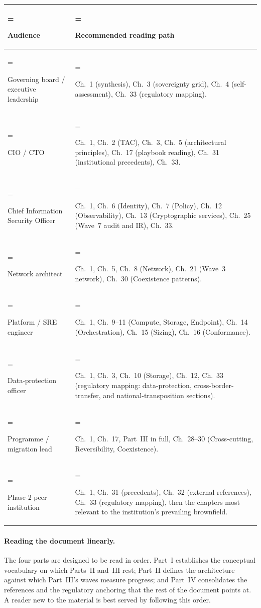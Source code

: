 \begin{table}[H]
\centering\small
\renewcommand{\arraystretch}{1.18}
\begin{tabularx}{\textwidth}{%
  >{\hsize=0.55\hsize\linewidth=\hsize\bfseries\raggedright\arraybackslash}X%
  >{\hsize=1.45\hsize\linewidth=\hsize\raggedright\arraybackslash}X%
}
\toprule
Audience & Recommended reading path \\
\midrule
Governing board / executive leadership
  & Ch.~1 (synthesis), Ch.~3 (sovereignty grid), Ch.~4
    (self-assessment), Ch.~33 (regulatory mapping). \\
CIO / CTO
  & Ch.~1, Ch.~2 (TAC), Ch.~3, Ch.~5 (architectural principles),
    Ch.~17 (playbook reading), Ch.~31 (institutional precedents),
    Ch.~33. \\
Chief Information Security Officer
  & Ch.~1, Ch.~6 (Identity), Ch.~7 (Policy), Ch.~12 (Observability),
    Ch.~13 (Cryptographic services), Ch.~25 (Wave~7 audit and IR),
    Ch.~33. \\
Network architect
  & Ch.~1, Ch.~5, Ch.~8 (Network), Ch.~21 (Wave~3 network),
    Ch.~30 (Coexistence patterns). \\
Platform / SRE engineer
  & Ch.~1, Ch.~9--11 (Compute, Storage, Endpoint),
    Ch.~14 (Orchestration), Ch.~15 (Sizing),
    Ch.~16 (Conformance). \\
Data-protection officer
  & Ch.~1, Ch.~3, Ch.~10 (Storage), Ch.~12,
    Ch.~33 (regulatory mapping: data-protection, cross-border-transfer,
    and national-transposition sections). \\
Programme / migration lead
  & Ch.~1, Ch.~17, Part~III in full,
    Ch.~28--30 (Cross-cutting, Reversibility, Coexistence). \\
Phase-2 peer institution
  & Ch.~1, Ch.~31 (precedents), Ch.~32 (external references),
    Ch.~33 (regulatory mapping), then the chapters most relevant
    to the institution's prevailing brownfield. \\
\bottomrule
\end{tabularx}
\end{table}

\paragraph{Reading the document linearly.} The four parts are
designed to be read in order. Part~I establishes the conceptual
vocabulary on which Parts~II and~III rest; Part~II defines the
architecture against which Part~III's waves measure progress; and
Part~IV consolidates the references and the regulatory anchoring
that the rest of the document points at. A reader new to the
material is best served by following this order.

